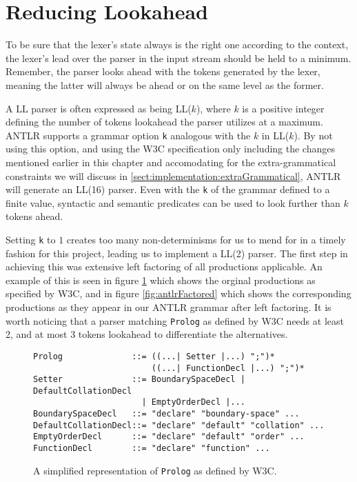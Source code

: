 \section{Reducing Lookahead}
\label{sect:implementation:reduceLookahead}
To be sure that the lexer's state always is the right one according to the context, the lexer's lead over the parser in the input stream should be held to a minimum. Remember, the parser looks ahead with the tokens generated by the lexer, meaning the latter will always be ahead or on the same level as the former.

A LL parser is often expressed as being LL($k$), where $k$ is a positive integer defining the number of tokens lookahead the parser utilizes at a maximum. ANTLR supports a grammar option \verb!k! analogous with the $k$ in LL($k$). By not using this option, and using the W3C specification only including the changes mentioned earlier in this chapter and accomodating for the extra-grammatical constraints we will discuss in \ref{sect:implementation:extraGrammatical}, ANTLR will generate an LL(16) parser. Even with the \verb!k! of the grammar defined to a finite value, syntactic and semantic predicates can be used to look further than $k$ tokens ahead. 

Setting \verb!k! to $1$ creates too many non-determinisms for us to mend for in a timely fashion for this project, leading us to implement a LL(2) parser. The first step in achieving this was extensive left factoring of all productions applicable. An example of this is seen in figure \ref{fig:w3cUnfactored} which shows the orginal productions as specified by W3C, and in figure \ref{fig:antlrFactored} which shows the corresponding productions as they appear in our ANTLR grammar after left factoring. It is worth noticing that a parser matching \verb!Prolog! as defined by W3C needs at least 2, and at most 3 tokens lookahead to differentiate the alternatives.

\begin{figure}[h!]
\begin{verbatim}
Prolog              ::= ((...| Setter |...) ";")* 
                        ((...| FunctionDecl |...) ";")*
Setter              ::= BoundarySpaceDecl | DefaultCollationDecl 
                      | EmptyOrderDecl |...
BoundarySpaceDecl   ::= "declare" "boundary-space" ...
DefaultCollationDecl::= "declare" "default" "collation" ...
EmptyOrderDecl      ::= "declare" "default" "order" ...
FunctionDecl        ::= "declare" "function" ...
\end{verbatim}
\label{fig:w3cUnfactored}
\caption[\texttt{Prolog} as defined by W3C]{A simplified representation of \texttt{Prolog} as defined by W3C.}
\end{figure}

